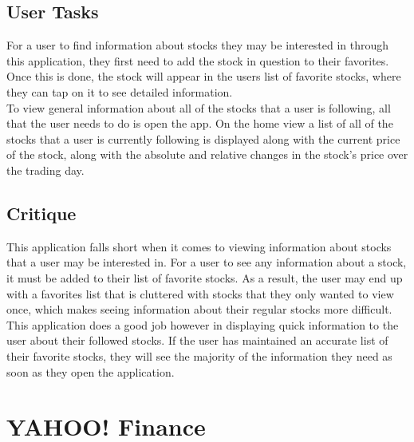 \documentclass{sigchi}
\begin{document}

\subsection{User Tasks}
For a user to find information about stocks they may be interested in through this application, they first need to add the stock in question to their favorites.  Once this is done, the stock will appear in the users list of favorite stocks, where they can tap on it to see detailed information.\\
To view general information about all of the stocks that a user is following, all that the user needs to do is open the app.  On the home view a list of all of the stocks that a user is currently following is displayed along with the current price of the stock, along with the absolute and relative changes in the stock's price over the trading day.

\subsection{Critique}
This application falls short when it comes to viewing information about stocks that a user may be interested in.  For a user to see any information about a stock, it must be added to their list of favorite stocks.  As a result, the user may end up with a favorites list that is cluttered with stocks that they only wanted to view once, which makes seeing information about their regular stocks more difficult.  This application does a good job however in displaying quick information to the user about their followed stocks.  If the user has maintained an accurate list of their favorite stocks, they will see the majority of the information they need as soon as they open the application.



\section{YAHOO! Finance}
\end{document}
